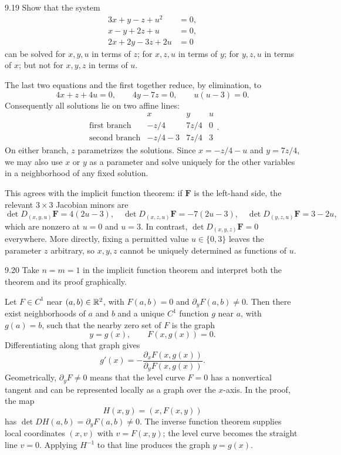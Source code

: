 \documentclass[11pt,oneside]{article}
\begin{document}
\begin{exercise}{9.19}
Show that the system
\[
 \begin{aligned}
 3x+y-z+u^2&=0,\\
 x-y+2z+u&=0,\\
 2x+2y-3z+2u&=0
 \end{aligned}
\]
can be solved for $x,y,u$ in terms of $z$; for $x,z,u$ in terms of $y$; for $y,z,u$ in terms of $x$; but not for $x,y,z$ in terms of $u$.
\end{exercise}
\begin{solution}
The last two equations and the first together reduce, by elimination, to
\[
 4x+z+4u=0,\qquad 4y-7z=0,\qquad u(u-3)=0.
\]
Consequently all solutions lie on two affine lines:
\[
 \begin{array}{c|ccc}
 &x&y&u\\\hline
 \text{first branch}&-z/4&7z/4&0\\
 \text{second branch}&-z/4-3&7z/4&3
 \end{array}.
\]
On either branch, $z$ parametrizes the solutions. Since $x=-z/4-u$ and $y=7z/4$, we may also use $x$ or $y$ as a parameter and solve uniquely for the other variables in a neighborhood of any fixed solution.

This agrees with the implicit function theorem: if $\mathbf F$ is the left-hand side, the relevant $3\times3$ Jacobian minors are
\[
 \det D_{(x,y,u)}\mathbf F=4(2u-3),\quad
 \det D_{(x,z,u)}\mathbf F=-7(2u-3),\quad
 \det D_{(y,z,u)}\mathbf F=3-2u,
\]
which are nonzero at $u=0$ and $u=3$. In contrast,
$\det D_{(x,y,z)}\mathbf F=0$ everywhere. More directly, fixing a permitted value $u\in\{0,3\}$ leaves the parameter $z$ arbitrary, so $x,y,z$ cannot be uniquely determined as functions of $u$.
\end{solution}

\begin{exercise}{9.20}
Take $n=m=1$ in the implicit function theorem and interpret both the theorem and its proof graphically.
\end{exercise}
\begin{solution}
Let $F\in C^1$ near $(a,b)\in\mathbb{R}^2$, with $F(a,b)=0$ and $\partial_yF(a,b)\ne0$. Then there exist neighborhoods of $a$ and $b$ and a unique $C^1$ function $g$ near $a$, with $g(a)=b$, such that the nearby zero set of $F$ is the graph
\[
 y=g(x),\qquad F(x,g(x))=0.
\]
Differentiating along that graph gives
\[
 g'(x)=-\frac{\partial_xF(x,g(x))}{\partial_yF(x,g(x))}.
\]
Geometrically, $\partial_yF\ne0$ means that the level curve $F=0$ has a nonvertical tangent and can be represented locally as a graph over the $x$-axis. In the proof, the map
\[
 H(x,y)=(x,F(x,y))
\]
has $\det DH(a,b)=\partial_yF(a,b)\ne0$. The inverse function theorem supplies local coordinates $(x,v)$ with $v=F(x,y)$; the level curve becomes the straight line $v=0$. Applying $H^{-1}$ to that line produces the graph $y=g(x)$.
\end{solution}
\end{document}
